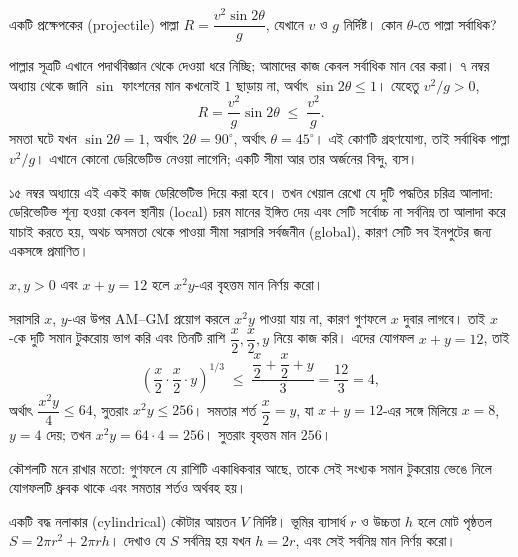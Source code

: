 \documentclass[11pt]{article}
\begin{document}
\begin{example}
একটি প্রক্ষেপকের (projectile) পাল্লা $R = \dfrac{v^2 \sin 2\theta}{g}$, যেখানে
$v$ ও $g$ নির্দিষ্ট। কোন $\theta$-তে পাল্লা সর্বাধিক?
\end{example}

\begin{solbox}
পাল্লার সূত্রটি এখানে পদার্থবিজ্ঞান থেকে দেওয়া ধরে নিচ্ছি; আমাদের কাজ কেবল
সর্বাধিক মান বের করা। ৭ নম্বর অধ্যায় থেকে জানি $\sin$ ফাংশনের মান কখনোই $1$
ছাড়ায় না, অর্থাৎ $\sin 2\theta \leq 1$। যেহেতু $v^2/g > 0$,
\[
  R = \frac{v^2}{g} \sin 2\theta \;\leq\; \frac{v^2}{g} .
\]
সমতা ঘটে যখন $\sin 2\theta = 1$, অর্থাৎ $2\theta = 90^{\circ}$, অর্থাৎ
$\theta = 45^{\circ}$। এই কোণটি গ্রহণযোগ্য, তাই সর্বাধিক পাল্লা $v^2/g$।
এখানে কোনো ডেরিভেটিভ নেওয়া লাগেনি; একটি সীমা আর তার অর্জনের বিন্দু, ব্যস।
\end{solbox}

\begin{remark}
১৫ নম্বর অধ্যায়ে এই একই কাজ ডেরিভেটিভ দিয়ে করা হবে। তখন খেয়াল রেখো যে
দুটি পদ্ধতির চরিত্র আলাদা: ডেরিভেটিভ শূন্য হওয়া কেবল স্থানীয় (local) চরম মানের
ইঙ্গিত দেয় এবং সেটি সর্বোচ্চ না সর্বনিম্ন তা আলাদা করে যাচাই করতে হয়, অথচ
অসমতা থেকে পাওয়া সীমা সরাসরি সর্বজনীন (global), কারণ সেটি সব ইনপুটের জন্য একসঙ্গে
প্রমাণিত।
\end{remark}

 $x, y > 0$ এবং $x + y = 12$ হলে $x^2 y$-এর বৃহত্তম মান নির্ণয় করো।

\begin{sol}
সরাসরি $x$, $y$-এর উপর AM--GM প্রয়োগ করলে $x^2y$ পাওয়া যায় না, কারণ গুণফলে
$x$ দুবার লাগবে। তাই $x$-কে দুটি সমান টুকরোয় ভাগ করি এবং তিনটি রাশি
$\dfrac{x}{2}, \dfrac{x}{2}, y$ নিয়ে কাজ করি। এদের যোগফল $x + y = 12$, তাই
\[
  \left( \frac{x}{2} \cdot \frac{x}{2} \cdot y \right)^{1/3}
  \;\leq\; \frac{\dfrac{x}{2} + \dfrac{x}{2} + y}{3} = \frac{12}{3} = 4 ,
\]
অর্থাৎ $\dfrac{x^2 y}{4} \leq 64$, সুতরাং $x^2 y \leq 256$। সমতার শর্ত
$\dfrac{x}{2} = y$, যা $x + y = 12$-এর সঙ্গে মিলিয়ে $x = 8$, $y = 4$ দেয়;
তখন $x^2y = 64 \cdot 4 = 256$। সুতরাং বৃহত্তম মান $256$।

কৌশলটি মনে রাখার মতো: গুণফলে যে রাশিটি একাধিকবার আছে, তাকে সেই সংখ্যক সমান
টুকরোয় ভেঙে নিলে যোগফলটি ধ্রুবক থাকে এবং সমতার শর্তও অর্থবহ হয়।
\end{sol}

 একটি বদ্ধ নলাকার (cylindrical) কৌটার আয়তন $V$ নির্দিষ্ট। ভূমির
ব্যাসার্ধ $r$ ও উচ্চতা $h$ হলে মোট পৃষ্ঠতল $S = 2\pi r^2 + 2\pi r h$। দেখাও যে
$S$ সর্বনিম্ন হয় যখন $h = 2r$, এবং সেই সর্বনিম্ন মান নির্ণয় করো।
\end{document}
